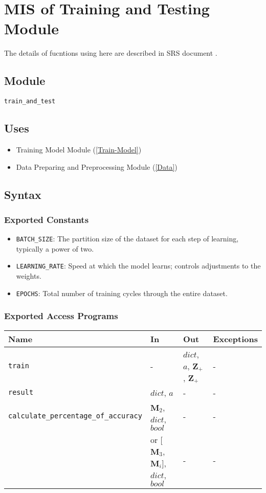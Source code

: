 \documentclass[12pt, titlepage]{article}
\def\code#1{\texttt{#1}}
\begin{document}
\newpage

\section{MIS of Training and Testing Module} \label{Train} 
The details of fucntions using here are described in SRS document \cite{SRS}.
\subsection{Module}
\code{train\_and\_test} 

\subsection{Uses}
\begin{itemize}
  \item Training Model Module (\ref{Train-Model})
  \item Data Preparing and Preprocessing Module (\ref{Data})
\end{itemize}


\subsection{Syntax}
\subsubsection{Exported Constants} \label{Train-Const}
\begin{itemize}
  \item \code{BATCH\_SIZE}: The partition size of the dataset for each step of learning, 
  typically a power of two.
  \item \code{LEARNING\_RATE}: Speed at which the model learns; controls adjustments to the weights.
  \item \code{EPOCHS}: Total number of training cycles through the entire dataset.
\end{itemize}

\subsubsection{Exported Access Programs}

\begin{center}
\begin{tabular}{p{7cm} p{3cm} p{3cm} p{2cm}}
\hline
\textbf{Name} & \textbf{In} & \textbf{Out} & \textbf{Exceptions} \\
\hline
\code{train} &- & $dict$, ${a}$, $\mathbf{Z}_{+}$, $\mathbf{Z}_{+}$  & -\\
\code{result} & $dict$, ${a}$ & - & -\\
\code{calculate\_percentage\_of\_accuracy} & $\mathbf{M}_{2}$, $dict$, $bool$ & - & -\\
                                           & or [$\mathbf{M}_{3}$, $\mathbf{M}_{i}$], $dict$, $bool$ & - & -\\
\hline
\end{tabular}
\end{center}
\end{document}
